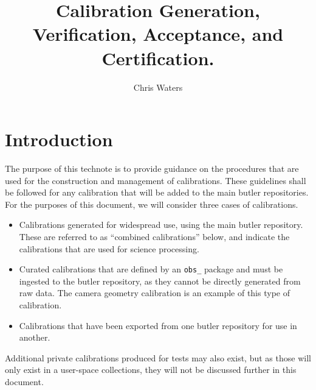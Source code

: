 \documentclass[DM,authoryear,toc]{lsstdoc}
\title{Calibration Generation, Verification, Acceptance, and Certification.}
\author{%
Chris Waters
}
\date{\vcsDate}
\begin{document}
\maketitle


\section{Introduction}

The purpose of this technote is to provide guidance on the procedures that are used for the construction and management of calibrations.
These guidelines shall be followed for any calibration that will be added to the main butler repositories.  For the purposes of this document, we will consider three cases of calibrations.

\begin{itemize}
\item Calibrations generated for widespread use, using the main butler repository.  These are referred to as ``combined calibrations'' below, and indicate the calibrations that are used for science processing.
\item Curated calibrations that are defined by an \verb|obs_| package and must be ingested to the butler repository, as they cannot be directly generated from raw data.  The camera geometry calibration is an example of this type of calibration.
\item Calibrations that have been exported from one butler repository for use in another.
\end{itemize}

Additional private calibrations produced for tests may also exist, but as those will only exist in a user-space collections, they will not be discussed further in this document.
\end{document}
